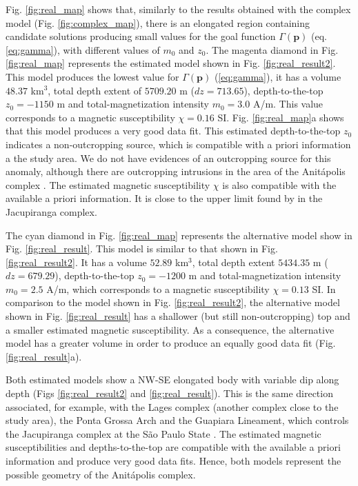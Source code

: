 Fig. \ref{fig:real_map} shows that, similarly to the results obtained with the 
complex model (Fig. \ref{fig:complex_map}), there is an elongated region containing 
candidate solutions producing small values for the goal function 
$\Gamma(\mathbf{p})$ (eq. \ref{eq:gamma}), with different values of $m_0$ and $z_0$.
The magenta diamond in Fig. \ref{fig:real_map} represents the estimated model 
shown in Fig. \ref{fig:real_result2}. 
This model produces the lowest value for $ \Gamma(\mathbf{p}) $ (\ref{eq:gamma}),
it has a volume $ 48.37 $ km$ ^3 $, total depth extent of $ 5709.20 $ m 
($ dz = 713.65 $), depth-to-the-top $z_0 = -1150$ m and total-magnetization intensity 
$m_0 = 3.0$ A/m. This value corresponds to a magnetic susceptibility 
$\chi = 0.16$ SI.
Fig. \ref{fig:real_map}a shows that this model produces a very good data fit.
This estimated depth-to-the-top $z_0$ indicates a non-outcropping source, 
which is compatible with a priori information a the study area. 
We do not have evidences of an outcropping source for this anomaly, 
although there are outcropping intrusions in the area of the Anit{\'a}polis 
complex \cite[]{gibson-1999}.
The estimated magnetic susceptibility $ \chi $ is also compatible with the 
available a priori information. It is close to the upper limit found by 
\citet{valdivia-2009} in the Jacupiranga complex.

The cyan diamond in Fig. \ref{fig:real_map} represents the alternative model 
show in Fig. \ref{fig:real_result}. This model is similar to that shown in 
Fig. \ref{fig:real_result2}. It has a volume $ 52.89 $ km$ ^3 $, total depth extent 
$ 5434.35 $ m ($ dz = 679.29 $), depth-to-the-top $z_0 = -1200$ m and 
total-magnetization intensity $m_0 = 2.5$ A/m, which corresponds to a magnetic 
susceptibility $\chi = 0.13$ SI. 
In comparison to the model shown in Fig. \ref{fig:real_result2}, the alternative model 
shown in Fig. \ref{fig:real_result} has a shallower (but still non-outcropping) top
and a smaller estimated magnetic susceptibility. As a consequence, the alternative 
model has a greater volume in order to produce an equally good data fit 
(Fig. \ref{fig:real_result}a).

Both estimated models show a NW-SE elongated body with variable dip along depth 
(Figs \ref{fig:real_result2} and \ref{fig:real_result}).
This is the same direction associated, for example, with the Lages complex (another 
complex close to the study area), the Ponta Grossa Arch and the Guapiara Lineament,
which controls the Jacupiranga complex at the S{\~a}o Paulo State 
\citep{GOMES2018}.
The estimated magnetic susceptibilities and depths-to-the-top are compatible with 
the available a priori information and produce very good data fits.
Hence, both models represent the possible geometry of the Anit{\'a}polis complex. 